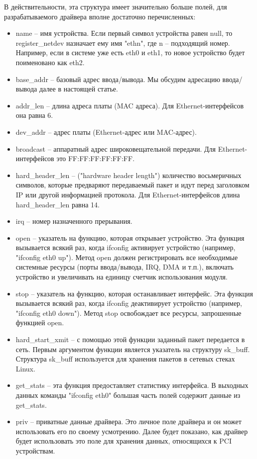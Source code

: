 В действительности, эта структура имеет значительно больше полей, для разрабатываемого драйвера вполне достаточно перечисленных:
\begin{itemize}
\item name -- имя устройства. Если первый символ устройства равен null, то register\_netdev назначает ему имя "ethn", где n -- подходящий номер. Например, если в системе уже есть eth0 и eth1, то новое устройство будет поименовано как eth2.
\item base\_addr -- базовый адрес ввода/вывода. Мы обсудим адресацию ввода/вывода далее в настоящей статье.
\item addr\_len -- длина адреса платы (MAC адреса). Для Ethernet-интерфейсов она равна 6.
\item dev\_addr -- адрес платы (Ethernet-адрес или MAC-адрес).
\item broadcast -- аппаратный адрес широковещательной передачи. Для Ethernet-интерфейсов это FF:FF:FF:FF:FF:FF.
\item hard\_header\_len -- ("hardware header length") количество восьмеричных символов, которые предваряют передаваемый пакет и идут перед заголовком IP или другой информацией протокола. Для Ethernet-интерфейсов длина hard\_header\_len равна 14.
\item irq -- номер назначенного прерывания.
\item open -- указатель на функцию, которая открывает устройство. Эта функция вызывается всякий раз, когда ifconfig активирует устройство (например, "ifconfig eth0 up"). Метод open должен регистрировать все необходимые системные ресурсы (порты ввода/вывода, IRQ, DMA и т.п.), включать устройство и увеличивать на единицу счетчик использования модуля.
\item stop -- указатель на функцию, которая останавливает интерфейс. Эта функция вызывается всякий раз, когда ifconfig деактивирует устройство (например, "ifconfig eth0 down"). Метод stop освобождает все ресурсы, запрошенные функцией open.
\item hard\_start\_xmit -- с помощью этой функции заданный пакет передается в сеть. Первым аргументом функции является указатель на структуру sk\_buff. Структура sk\_buff используется для хранения пакетов в сетевых стеках Linux.
\item get\_stats – эта функция предоставляет статистику интерфейса. В выходных данных команды "ifconfig eth0" большая часть полей содержит данные из get\_stats.
\item priv -- приватные данные драйвера. Это личное поле драйвера и он может использовать его по своему усмотрению. Далее будет показано, как драйвер будет использовать это поле для хранения данных, относящихся к PCI устройствам. 
\end{itemize}

